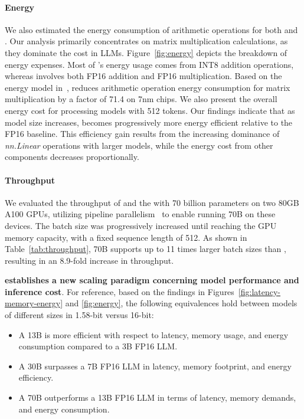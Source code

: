 \paragraph{Energy}

We also estimated the energy consumption of arithmetic operations for both  and . Our analysis primarily concentrates on matrix multiplication calculations, as they dominate the cost in LLMs. Figure~\ref{fig:energy} depicts the breakdown of energy expenses. Most of 's energy usage comes from INT8 addition operations, whereas  involves both FP16 addition and FP16 multiplication. Based on the energy model in~\cite{energycost, pokebnn},  reduces arithmetic operation energy consumption for matrix multiplication by a factor of 71.4 on 7nm chips. We also present the overall energy cost for processing models with 512 tokens. Our findings indicate that as model size increases,  becomes progressively more energy efficient relative to the FP16  baseline. This efficiency gain results from the increasing dominance of \emph{nn.Linear} operations with larger models, while the energy cost from other components decreases proportionally.

\paragraph{Throughput}

We evaluated the throughput of  and the  with 70 billion parameters on two 80GB A100 GPUs, utilizing pipeline parallelism~\cite{gpipe} to enable running  70B on these devices. The batch size was progressively increased until reaching the GPU memory capacity, with a fixed sequence length of 512. As shown in Table~\ref{tab:throughput},  70B supports up to 11 times larger batch sizes than , resulting in an 8.9-fold increase in throughput.

\textbf{ establishes a new scaling paradigm concerning model performance and inference cost}. For reference, based on the findings in Figures~\ref{fig:latency-memory-energy} and \ref{fig:energy}, the following equivalences hold between models of different sizes in 1.58-bit versus 16-bit:

\begin{itemize}
    \item A 13B  is more efficient with respect to latency, memory usage, and energy consumption compared to a 3B FP16 LLM.
    \item A 30B  surpasses a 7B FP16 LLM in latency, memory footprint, and energy efficiency.
    \item A 70B  outperforms a 13B FP16 LLM in terms of latency, memory demands, and energy consumption.
\end{itemize}

